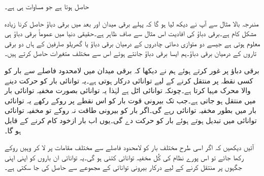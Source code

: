 حاصل ہوتا ہے جو مساوات  ہی ہے۔

مندرجہ بالا مثال سے آپ نے دیکھ لیا ہو گا کہ پہلے برقی میدان اور بعد میں برقی دباؤ حاصل کرنا زیادہ مشکل کام ہے۔برقی دباؤ کی افادیت  اس مثال سے صاف ظاہر ہے۔حقیقی دنیا میں عموماً برقی دباؤ ہی  معلوم ہوتی ہے جیسے دو متوازی دھاتی چادروں کے درمیان برقی دباؤ یا گھریلو صارفین کے ہاں دو برقی تاروں کے درمیان برقی دباؤ۔ہم ایسا برقی دباؤ جانتے ہوئے اس سے مختلف متغیرات حاصل کرتے ہیں۔ 

برقی دباؤ پر غور کرتے ہوئے ہم نے دیکھا کہ برقی میدان میں لامحدود فاصلے سے بار کو کسی نقطہ پر منتقل کرنے کے لیے توانائی درکار ہوتی ہے۔یہ توانائی بار کو حرکت دینے والا محرک مہیا کرتا ہے۔چونکہ توانائی اٹل ہے لہٰذا یہ توانائی بصورت مخفیہ توانائی بار میں منتقل ہو جاتی ہے۔جب تک بیرونی قوت بار کو اس نقطے پر روکے رکھے یہ توانائی بار میں بطور مخفیہ توانائی رہے گی۔اگر بار کو بیرونی طاقت نہ روکے تو مخفیہ توانائی  توانائی میں تبدیل ہوتے ہوئے بار کو حرکت دے گی۔یوں اب بار ازخود کام کرنے کے قابل ہو گا۔

آئیں دیکھیں کہ اگر اسی طرح مختلف بار کو لامحدود فاصلے سے مختلف مقامات پر لا کر وہیں روکے رکھا جائے تو اس پورے نظام کی کُل مخفیہ توانائی کتنی ہو گی۔یہ توانائی ان باروں کو اپنی اپنی  جگہوں پر منتقل کرنے کے لیے درکار بیرونی توانائی کے مجموعے سے حاصل کی جا سکتی ہے۔

